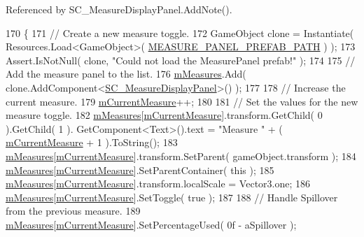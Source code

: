 Referenced by S\+C\+\_\+\+Measure\+Display\+Panel.\+Add\+Note().


\begin{DoxyCode}
170     \{
171         \textcolor{comment}{// Create a new measure toggle.}
172         GameObject clone = Instantiate( Resources.Load<GameObject>( 
      \hyperlink{group___s_c___n_d_c_const_gabc95cd739b62996e8a19f0e9417e5f8e}{MEASURE\_PANEL\_PREFAB\_PATH} ) );
173         Assert.IsNotNull( clone, \textcolor{stringliteral}{"Could not load the MeasurePanel prefab!"} );
174 
175         \textcolor{comment}{// Add the measure panel to the list.}
176         \hyperlink{group___s_c___n_d_c_priv_var_gaa072fb53f6bd6646bc85f2ebc2a02229}{mMeasures}.Add( clone.AddComponent<\hyperlink{class_s_c___measure_display_panel}{SC\_MeasureDisplayPanel}>() );
177 
178         \textcolor{comment}{// Increase the current measure.}
179         \hyperlink{group___s_c___n_d_c_priv_var_ga28ce2bf8358c9f686b5b9e362aa96dff}{mCurrentMeasure}++;
180 
181         \textcolor{comment}{// Set the values for the new measure toggle.}
182         \hyperlink{group___s_c___n_d_c_priv_var_gaa072fb53f6bd6646bc85f2ebc2a02229}{mMeasures}[\hyperlink{group___s_c___n_d_c_priv_var_ga28ce2bf8358c9f686b5b9e362aa96dff}{mCurrentMeasure}].transform.GetChild( 0 ).GetChild( 1 ).
      GetComponent<Text>().text = \textcolor{stringliteral}{"Measure "} + ( \hyperlink{group___s_c___n_d_c_priv_var_ga28ce2bf8358c9f686b5b9e362aa96dff}{mCurrentMeasure} + 1 ).ToString();
183         \hyperlink{group___s_c___n_d_c_priv_var_gaa072fb53f6bd6646bc85f2ebc2a02229}{mMeasures}[\hyperlink{group___s_c___n_d_c_priv_var_ga28ce2bf8358c9f686b5b9e362aa96dff}{mCurrentMeasure}].transform.SetParent( gameObject.transform );
184         \hyperlink{group___s_c___n_d_c_priv_var_gaa072fb53f6bd6646bc85f2ebc2a02229}{mMeasures}[\hyperlink{group___s_c___n_d_c_priv_var_ga28ce2bf8358c9f686b5b9e362aa96dff}{mCurrentMeasure}].SetParentContainer( \textcolor{keyword}{this} );
185         \hyperlink{group___s_c___n_d_c_priv_var_gaa072fb53f6bd6646bc85f2ebc2a02229}{mMeasures}[\hyperlink{group___s_c___n_d_c_priv_var_ga28ce2bf8358c9f686b5b9e362aa96dff}{mCurrentMeasure}].transform.localScale = Vector3.one;
186         \hyperlink{group___s_c___n_d_c_priv_var_gaa072fb53f6bd6646bc85f2ebc2a02229}{mMeasures}[\hyperlink{group___s_c___n_d_c_priv_var_ga28ce2bf8358c9f686b5b9e362aa96dff}{mCurrentMeasure}].SetToggle( \textcolor{keyword}{true} );
187 
188         \textcolor{comment}{// Handle Spillover from the previous measure.}
189         \hyperlink{group___s_c___n_d_c_priv_var_gaa072fb53f6bd6646bc85f2ebc2a02229}{mMeasures}[\hyperlink{group___s_c___n_d_c_priv_var_ga28ce2bf8358c9f686b5b9e362aa96dff}{mCurrentMeasure}].SetPercentageUsed( 0f - aSpillover );

\end{DoxyCode}
